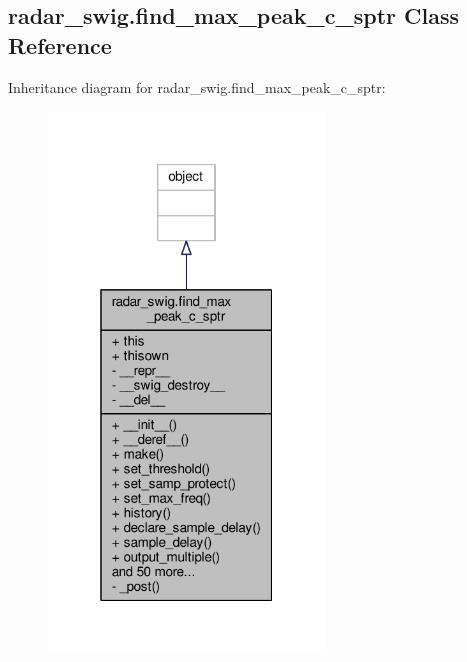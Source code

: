 \subsection{radar\+\_\+swig.\+find\+\_\+max\+\_\+peak\+\_\+c\+\_\+sptr Class Reference}
\label{classradar__swig_1_1find__max__peak__c__sptr}


Inheritance diagram for radar\+\_\+swig.\+find\+\_\+max\+\_\+peak\+\_\+c\+\_\+sptr\+:
\nopagebreak
\begin{figure}[H]
\begin{center}
\leavevmode
\includegraphics[width=208pt]{de/df9/classradar__swig_1_1find__max__peak__c__sptr__inherit__graph}
\end{center}
\end{figure}


